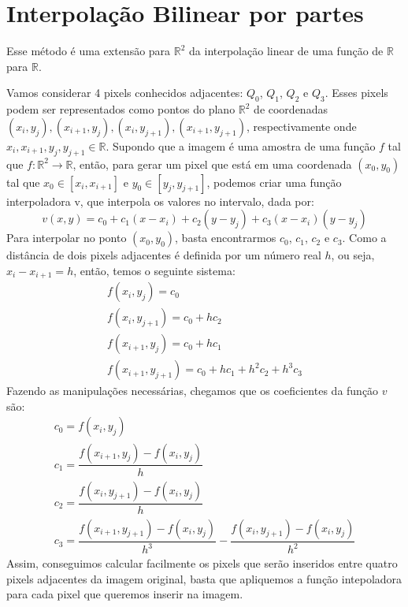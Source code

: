 \documentclass{article}
\begin{document}
	\section{Interpolação Bilinear por partes}
	Esse método é uma extensão para $\mathbb{R}^2$ da interpolação linear de uma função de $\mathbb{R}$ para $\mathbb{R}$. \par
	Vamos considerar 4 pixels conhecidos adjacentes: $Q_{0}$, $Q_{1}$, $Q_{2}$ e $Q_{3}$. Esses pixels podem ser representados como pontos do plano $\mathbb{R}^2$ de coordenadas $(x_{i}, y_{j}), (x_{i+1}, y_{j}), (x_{i}, y_{j+1}), (x_{i+1}, y_{j+1})$, respectivamente onde $x_{i}, x_{i+1}, y_{j}, y_{j+1} \in \mathbb{R}$. Supondo que a imagem é uma amostra de uma função $f$ tal que $f: \mathbb{R}^2 \rightarrow \mathbb{R} $, então, para gerar um pixel que está em uma coordenada $(x_{0}, y_{0})$ tal que $x_{0} \in [x_{i}, x_{i+1}]$ e $y_{0} \in [y_{j}, y_{j+1}]$, podemos criar uma função interpoladora v, que interpola os valores no intervalo, dada por:
	 \begin{equation}
	 v(x, y) = c_{0} + c_{1}(x - x_{i}) + c_{2}(y - y_{j}) + c_{3}(x - x_{i})(y - y_{j})
	 \end{equation}
	 Para interpolar no ponto  $(x_{0}, y_{0})$, basta encontrarmos $c_{0}$, $c_{1}$, $c_{2}$ e $c_{3}$. Como a distância de dois pixels adjacentes é definida por um número real $h$, ou seja, $x_{i} - x_{i+1} = h$, então, temos o seguinte sistema: 
	\[
	 	\begin{array}{llll}
	 		f(x_{i}, y_{j}) = c_{0}\\
	 		f(x_{i}, y_{j+1}) = c_{0} + hc_{2}\\
	 		f(x_{i+1}, y_{j}) = c_{0} + hc_{1}\\
	 		f(x_{i+1}, y_{j+1}) = c_{0} + hc_{1} + h^2c_{2} + h^3c_{3}
	 	\end{array}
	 \]
	 Fazendo as manipulações necessárias, chegamos que os coeficientes da função $v$ são: 
	 \[
	 	\begin{array}{llll}
	 	c_{0} = f(x_{i}, y_{j})\\
	 	c_{1} = \dfrac{f(x_{i+1}, y_{j}) - f(x_{i}, y_{j})}{h}\\
	 	c_{2} = \dfrac{f(x_{i}, y_{j+1}) - f(x_{i}, y_{j})}{h}\\
	 	c_{3} = \dfrac{f(x_{i+1}, y_{j+1}) - f(x_{i}, y_{j})}{h^3} - \dfrac{f(x_{i}, y_{j+1}) - f(x_{i}, y_{j})}{h^2}
	 	\end{array}
	 \]
	 Assim, conseguimos calcular facilmente os pixels que serão inseridos entre quatro pixels adjacentes da imagem original, basta que apliquemos a função intepoladora para cada pixel que queremos inserir na imagem.
\end{document}
